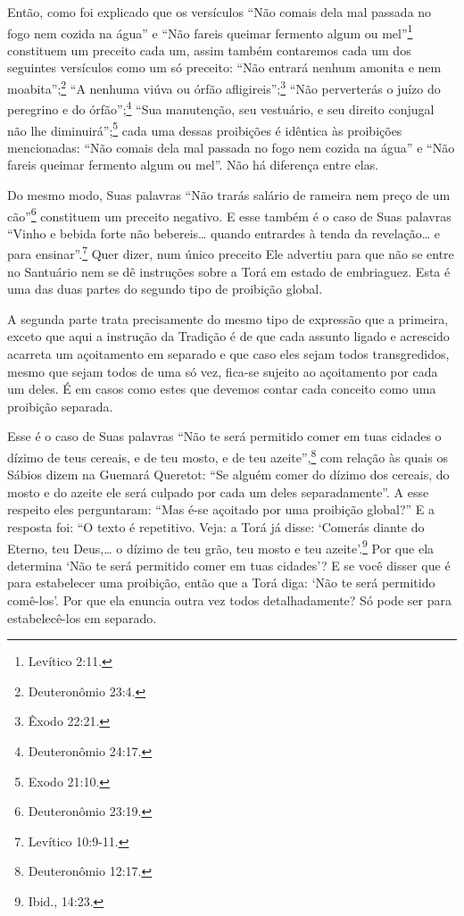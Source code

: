 Então, como foi explicado que os versículos ``Não comais dela mal
passada no fogo nem cozida na água'' e ``Não fareis queimar fermento
algum ou mel''\footnote{Levítico 2:11.} constituem um preceito cada um, assim
também contaremos cada um dos seguintes versículos como um só preceito:
``Não entrará nenhum amonita e nem moabita'';\footnote{Deuteronômio 23:4.} ``A
nenhuma viúva ou órfão afligireis'';\footnote{Êxodo 22:21.} ``Não perverterás o
juízo do peregrino e do órfão'';\footnote{Deuteronômio 24:17.} ``Sua
manutenção, seu vestuário, e seu direito conjugal não lhe diminuirá'';\footnote{Exodo 21:10.} cada uma dessas proibições é idêntica às proibições
mencionadas: ``Não comais dela mal passada no fogo nem cozida na água''
e ``Não fareis queimar fermento algum ou mel''. Não há diferença entre
elas.

Do mesmo modo, Suas palavras ``Não trarás salário de rameira nem preço
de um cão''\footnote{Deuteronômio 23:19.} constituem um preceito negativo. E esse
também é o caso de Suas palavras ``Vinho e bebida forte não bebereis\ldots{}
quando entrardes à tenda da revelação\ldots{} e para ensinar''.\footnote{Levítico
10:9-11.} Quer dizer, num único preceito Ele advertiu para que não se
entre no Santuário nem se dê instruções sobre a Torá em estado de
embriaguez. Esta é uma das duas partes do segundo tipo de proibição
global.

A segunda parte trata precisamente do mesmo tipo de expressão que a
primeira, exceto que aqui a instrução da Tradição é de que cada assunto
ligado e acrescido acarreta um açoitamento em separado e que caso eles
sejam todos transgredidos, mesmo que sejam todos de uma só vez, fica-se
sujeito ao açoitamento por cada um deles. É em casos como estes que
devemos contar cada conceito como uma proibição separada.



Esse é o caso de Suas palavras ``Não te será permitido comer em tuas
cidades o dízimo de teus cereais, e de teu mosto, e de teu azeite'',\footnote{Deuteronômio 12:17.} com relação às quais os Sábios dizem na Guemará
Queretot: ``Se alguém comer do dízimo dos cereais, do mosto e do azeite
ele será culpado por cada um deles separadamente''. A esse respeito eles
perguntaram: ``Mas é-se açoitado por uma proibição global?'' E a
resposta foi: ``O texto é repetitivo. Veja: a Torá já disse: `Comerás
diante do Eterno, teu Deus,\ldots{} o dízimo de teu grão, teu mosto e teu
azeite'.\footnote{Ibid., 14:23.} Por que ela determina `Não te será permitido
comer em tuas cidades'? E se você disser que é para estabelecer uma
proibição, então que a Torá diga: `Não te será permitido comê-los'.
Por que ela enuncia outra vez todos detalhadamente? Só pode ser para
estabelecê-los em separado.


